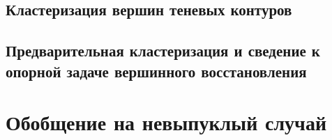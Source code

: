 \documentclass[a4paper, 12pt, titlepage]{article}
\theoremstyle{definition}
\theoremstyle{plain}
\theoremstyle{plain}
\begin{document}
\subsection{Кластеризация вершин теневых контуров}

\subsection{Предварительная кластеризация и сведение к опорной задаче
вершинного восстановления}




\section{Обобщение на невыпуклый случай}

\newpage


\end{document}
